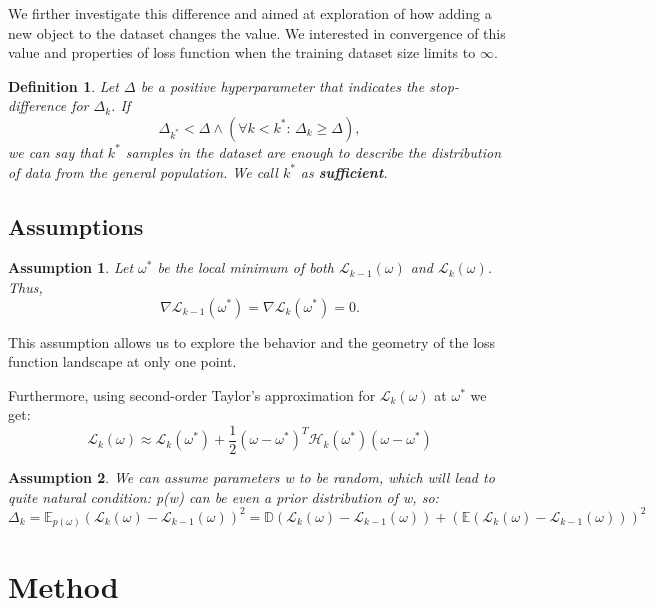 \documentclass{article}
\newtheorem{definition}{Definition}
\newtheorem{assumption}{Assumption}
\begin{document}
We firther investigate this difference and aimed at exploration of how adding a new object to the dataset changes the value.
We interested in convergence of this value and properties of loss function when the training dataset size limits to $\infty$.


\begin{definition}
  Let $\Delta$ be a positive hyperparameter that indicates the stop-difference for $\Delta_k$. If
  $$\Delta_{k^*} < \Delta \wedge \left( \forall k < k^*: \, \Delta_k \geq \Delta \right),$$
  we can say that $k^*$ samples in the dataset are enough to describe the distribution of data from the general population.
  We call $k^*$ as \textbf{sufficient}.
\end{definition}

\subsection{Assumptions}

\begin{assumption}
  Let $\omega^*$ be the local minimum of both $\mathcal{L}_{k-1}(\omega)$ and $\mathcal{L}_{k}(\omega)$.
  Thus, $$\nabla \mathcal{L}_{k-1}(\omega^*) = \nabla \mathcal{L}_{k}(\omega^*) = 0.$$
\end{assumption}

This assumption allows us to explore the behavior and the geometry of the loss function landscape at only one point.

Furthermore, using second-order Taylor's approximation for $\mathcal{L}_{k}(\omega)$ at $\omega^*$ we get:
$$\mathcal{L}_{k}(\omega) \approx \mathcal{L}_{k}(\omega^*) + \frac12 (\omega - \omega^*)^T \mathcal{H}_k(\omega^*)
  (\omega - \omega^*)$$

\begin{assumption}
  We can assume parameters w to be random, which will lead to quite natural condition: p(w) can be even a prior
  distribution of w, so: $$\Delta_{k} = \mathbb{E}_{p(\omega)} \left( \mathcal{L}_{k}(\omega) - \mathcal{L}_{k-1}(\omega)
    \right)^2 = \mathbb{D} \left( \mathcal{L}_{k}(\omega) - \mathcal{L}_{k-1}(\omega) \right) + \left( \mathbb{E} \left(
      \mathcal{L}_{k}(\omega) - \mathcal{L}_{k-1}(\omega) \right) \right)^2$$
\end{assumption}

\section{Method}\label{sec:method}
\end{document}
